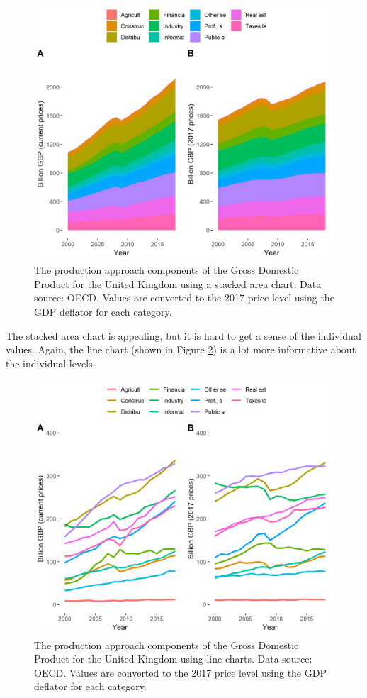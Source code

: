 \documentclass[]{book}
\begin{document}
\begin{figure}

{\centering \includegraphics[width=0.9\linewidth]{_resources/chapter_gdp/fig7} 

}

\caption{The production approach components of the Gross Domestic Product for the United Kingdom using a stacked area chart. Data source: OECD. Values are converted to the 2017 price level using the GDP deflator for each category.}\label{fig:gdp9}
\end{figure}

The stacked area chart is appealing, but it is hard to get a sense of the individual values. Again, the line chart (shown in Figure \ref{fig:gdp10}) is a lot more informative about the individual levels.

\begin{figure}

{\centering \includegraphics[width=0.9\linewidth]{_resources/chapter_gdp/fig8} 

}

\caption{The production approach components of the Gross Domestic Product for the United Kingdom using line charts. Data source: OECD. Values are converted to the 2017 price level using the GDP deflator for each category.}\label{fig:gdp10}
\end{figure}
\end{document}
